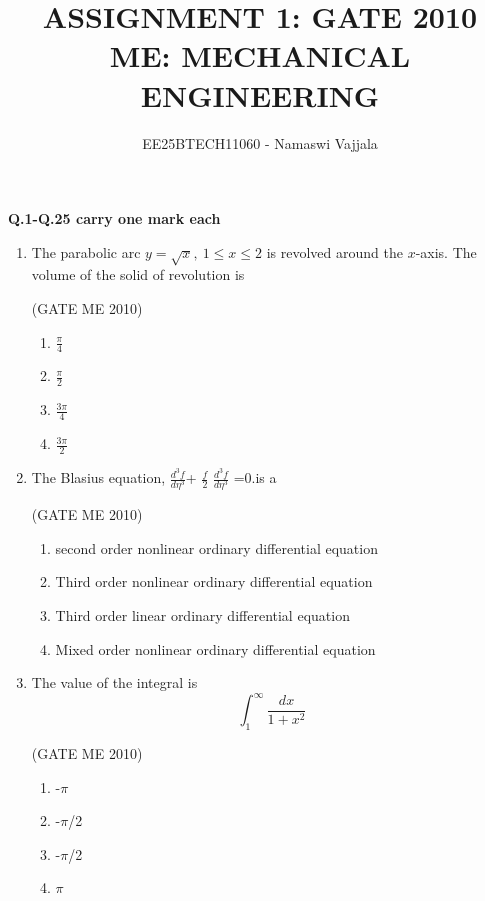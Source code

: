 \documentclass[journal,12pt,onecolumn]{IEEEtran}
\theoremstyle{remark}
\begin{document}
\title{ASSIGNMENT 1: GATE 2010 \\ ME: MECHANICAL ENGINEERING}
\author{EE25BTECH11060 - Namaswi Vajjala}
\maketitle

\renewcommand{\thefigure}{\theenumi}
\renewcommand{\thetable}{\theenumi}

\textbf{Q.1-Q.25 carry one mark each}
\begin{enumerate}
    \item  The parabolic arc $y = \sqrt{x},~1 \le x \le 2$ is revolved around the $x$-axis. The volume of the solid of revolution is

    
    \hfill{(GATE ME 2010)}\\
\begin{multicols}{4}
\begin{enumerate}
\item  $\frac{\pi}{4}$ 
\item $\frac{\pi}{2}$ 
\item $\frac{3\pi}{4}$ 
\item $\frac{3\pi}{2}$
    \end{enumerate}
\end{multicols}
  

\item The Blasius equation,
$\frac{d^3f}{d\eta^3}$+
$\frac{f}{2}$
$\frac{d^3f}{d\eta^3}$
=0.\;is a

 \hfill{(GATE ME 2010)}\\
    \begin{enumerate}
\item second order nonlinear ordinary differential equation 
\item Third order nonlinear ordinary differential equation
\item Third order linear ordinary differential equation
\item Mixed order nonlinear ordinary differential equation
    \end{enumerate}

\item The value of the integral is
\[
\int_{1}^{\infty}\frac{dx}{1+x^2}
\]


 \hfill{(GATE ME 2010)}\\
\begin{multicols}{4}
\begin{enumerate}
\item -$\pi$ 
\item -$\pi$/2
\item -$\pi$/2
\item $\pi$ 
 \end{enumerate}
\end{multicols}





\end{enumerate}
\end{document}
